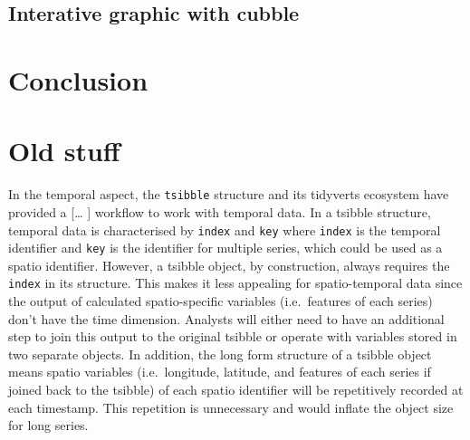 \documentclass[
]{jss}
\begin{document}
\hypertarget{interative-graphic-with-cubble}{%
\subsection{Interative graphic with
cubble}\label{interative-graphic-with-cubble}}

\begin{CodeChunk}
\end{CodeChunk}

\hypertarget{conclusion}{%
\section{Conclusion}\label{conclusion}}

\newpage

\hypertarget{old-stuff}{%
\section{Old stuff}\label{old-stuff}}

In the temporal aspect, the \texttt{tsibble} \citep{tsibbles} structure
and its tidyverts ecosystem have provided a {[}\ldots{} {]} workflow to
work with temporal data. In a tsibble structure, temporal data is
characterised by \texttt{index} and \texttt{key} where \texttt{index} is
the temporal identifier and \texttt{key} is the identifier for multiple
series, which could be used as a spatio identifier. However, a tsibble
object, by construction, always requires the \texttt{index} in its
structure. This makes it less appealing for spatio-temporal data since
the output of calculated spatio-specific variables (i.e.~features of
each series) don't have the time dimension. Analysts will either need to
have an additional step to join this output to the original tsibble or
operate with variables stored in two separate objects. In addition, the
long form structure of a tsibble object means spatio variables
(i.e.~longitude, latitude, and features of each series if joined back to
the tsibble) of each spatio identifier will be repetitively recorded at
each timestamp. This repetition is unnecessary and would inflate the
object size for long series.
\end{document}
